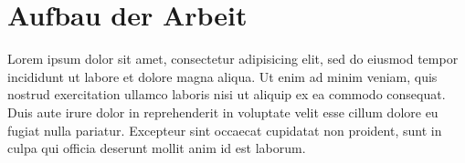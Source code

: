 \documentclass{scrartcl}
\begin{document}
\section{Aufbau der Arbeit}
\label{sec:aufbau}
Lorem ipsum dolor sit amet, consectetur adipisicing elit, sed do eiusmod tempor incididunt ut labore et dolore magna aliqua. Ut enim ad minim veniam, quis nostrud exercitation ullamco laboris nisi ut aliquip ex ea commodo consequat. Duis aute irure dolor in reprehenderit in voluptate velit esse cillum dolore eu fugiat nulla pariatur. Excepteur sint occaecat cupidatat non proident, sunt in culpa qui officia deserunt mollit anim id est laborum.




\end{document}
